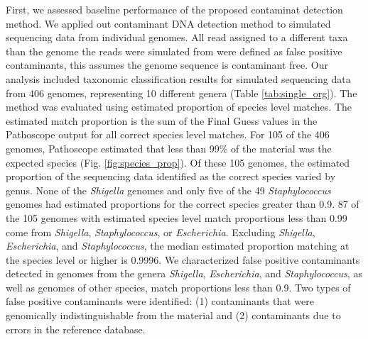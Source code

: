 \documentclass[fleqn,10pt,lineno]{wlpeerj}\usepackage[]{graphicx}\usepackage[]{color}
\begin{document}
First, we assessed baseline performance of the proposed contaminat detection method. 
We applied out contaminant DNA detection method to simulated sequencing data from individual genomes. 
All read assigned to a different taxa than the genome the reads were simulated from were defined as false positive contaminants, 
this assumes the genome sequence is contaminant free. 
Our analysis included taxonomic classification results for simulated sequencing data  from 406 genomes, representing 10 different genera (Table \ref{tab:single_org}).
The method was evaluated using estimated proportion of species level matches.
The estimated match proportion is the sum of the Final Guess values in the Pathoscope output for all correct species level matches.
For 105 of the 406 genomes, Pathoscope estimated that less than 99\% of the material was the expected species (Fig. \ref{fig:species_prop}).
Of these 105 genomes, the estimated proportion of the sequencing data identified as the correct species varied by genus.
None of the \textit{Shigella} genomes and only five of the 49 \textit{Staphylococcus} genomes had estimated proportions for the correct species greater than 0.9.
87 of the 105 genomes with estimated species level match proportions less than 0.99 come from \textit{Shigella}, \textit{Staphylococcus}, or \textit{Escherichia}.
Excluding \textit{Shigella}, \textit{Escherichia}, and \textit{Staphylococcus}, the median estimated proportion matching at the species level or higher is  0.9996.
We characterized false positive contaminants detected in genomes from the genera \textit{Shigella}, \textit{Escherichia}, and \textit{Staphylococcus}, as well as genomes of other species, match proportions less than 0.9.
Two types of false positive contaminants were identified: (1) contaminants that were genomically indistinguishable from the material and (2) contaminants due to errors in the reference database.
\end{document}
